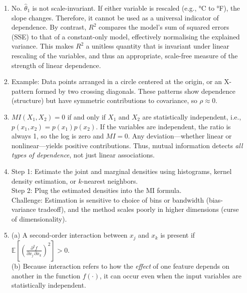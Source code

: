 \documentclass[11pt]{article}
\begin{document}
\begin{enumerate}[label=\textbf{Q\arabic*.}, itemsep=1em]
  \item No. $\hat\theta_1$ is not scale-invariant. If either variable is rescaled (e.g., °C to °F), the slope changes. Therefore, it cannot be used as a universal indicator of dependence. 
  By contrast, $R^2$ compares the model’s sum of squared errors (SSE) to that of a constant-only model, effectively normalising the explained variance. This makes $R^2$ a unitless quantity that is invariant under linear rescaling of the variables, and thus an appropriate, scale-free measure of the strength of linear dependence.

  \item Example: Data points arranged in a circle centered at the origin, or an X-pattern formed by two crossing diagonals. These patterns show dependence (structure) but have symmetric contributions to covariance, so $\rho \approx 0$.

  \item $MI(X_1,X_2) = 0$ if and only if $X_1$ and $X_2$ are statistically independent, i.e., $p(x_1,x_2) = p(x_1)p(x_2)$. If the variables are independent, the ratio is always 1, so the log is zero and $MI = 0$. Any deviation—whether linear or nonlinear—yields positive contributions. Thus, mutual information detects \emph{all types of dependence}, not just linear associations. 

  \item Step 1: Estimate the joint and marginal densities using histograms, kernel density estimation, or $k$-nearest neighbors. \\
        Step 2: Plug the estimated densities into the MI formula. \\
        Challenge: Estimation is sensitive to choice of bins or bandwidth (bias-variance tradeoff), and the method scales poorly in higher dimensions (curse of dimensionality).

  \item (a) A second-order interaction between $x_j$ and $x_k$ is present if
    $\mathbb{E}\left[\left(\frac{\partial^2 f}{\partial x_j\,\partial x_k}\right)^2\right] > 0.$\\
    (b) Because interaction refers to how the \emph{effect} of one feature depends on another in the function $f(\cdot)$, it can occur even when the input variables are statistically independent.

\end{enumerate}
\end{document}
